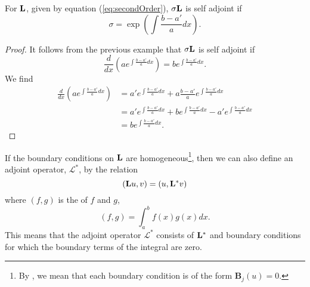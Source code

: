\begin{theorem}
	For \(\mathrm{\bf{L}}\), given by equation (\ref*{eq:secondOrder}), \(\sigma\mathrm{\bf{L}}\) is self adjoint if
		\begin{equation}
			\sigma = \exp\left({\int \frac{b-a'}{a}dx}\right).
		\end{equation}
\end{theorem}

\begin{proof}
	It follows from the previous example that \(\sigma\mathrm{\bf{L}}\) is self adjoint if
	\begin{equation*}
		\frac{d}{dx}\left(ae^{\int \frac{b-a'}{a}dx}\right) = be^{\int \frac{b-a'}{a}dx}.
	\end{equation*}
	We find
	\begin{equation*}
		\begin{split}
			\frac{d}{dx}\left(ae^{\int \frac{b-a'}{a}dx}\right) &= a'e^{\int \frac{b-a'}{a}dx} + a\frac{b-a'}{a}e^{\int \frac{b-a'}{a}dx}\\
			&=a'e^{\int \frac{b-a'}{a}dx} + be^{\int \frac{b-a'}{a}dx} - a'e^{\int \frac{b-a'}{a}dx}\\
			&=be^{\int \frac{b-a'}{a}dx}.
		\end{split}
	\end{equation*}
\end{proof}

\begin{definition}
	If the boundary conditions on \(\mathrm{\bf{L}}\) are homogeneous\footnote{By , we mean that each boundary condition is of the form \(\mathbf{B}_j (u)=0\).}, then we can also define an adjoint operator, \(\mathcal{L}^*\), by the relation
	\begin{equation}
		(\mathrm{\bf{L}} u,v) = (u,\mathrm{\bf{L^*}} v)
	\end{equation}
	where \((f,g)\) is the  of \(f\) and \(g\),
	\begin{equation}
		(f,g) = \int_a^bf(x)g(x)dx.
	\end{equation}
	This means that the adjoint operator \(\mathcal{L}^*\) consists of \(\mathrm{\bf{L^*}} \) and boundary conditions for which the boundary terms of the integral are zero. 
\end{definition}

